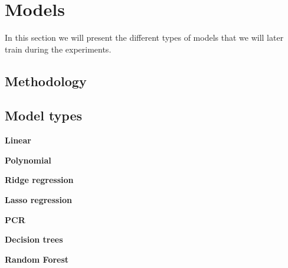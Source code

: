 \section{Models}

In this section we will present the different types of models that we will later train during the experiments. 

\subsection{Methodology}

\subsection{Model types}


\textbf{Linear}

\textbf{Polynomial}

\textbf{Ridge regression}

\textbf{Lasso regression}

\textbf{PCR}

\textbf{Decision trees}

\textbf{Random Forest}


